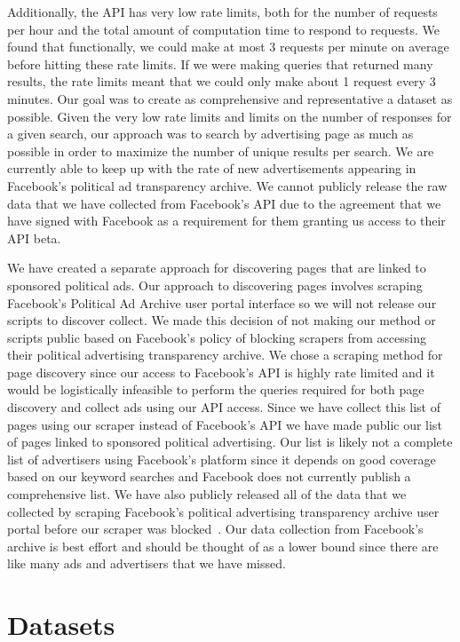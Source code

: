 \documentclass[fleqn,10pt]{wlscirep}
\begin{document}
Additionally, the API has very low rate limits, both for the number of requests per hour and the total amount of computation time to respond to requests. We found that functionally, we could make at most 3 requests per minute on average before hitting these rate limits. If we were making queries that returned many results, the rate limits meant that we could only make about 1 request every 3 minutes. Our goal was to create as comprehensive and representative a dataset as possible. Given the very low rate limits and limits on the number of responses for a given search, our approach was to search by advertising page as much as possible in order to maximize the number of unique results per search. We are currently able to keep up with the rate of new advertisements appearing in Facebook's political ad transparency archive. We cannot publicly release the raw data that we have collected from Facebook's API due to the agreement that we have signed with Facebook as a requirement for them granting us access to their API beta.

We have created a separate approach for discovering pages that are linked to sponsored political ads. Our approach to discovering pages involves scraping Facebook's Political Ad Archive user portal interface so we will not release our scripts to discover collect. We made this decision of not making our method or scripts public based on Facebook's policy of blocking scrapers from accessing their political advertising transparency archive. We chose a scraping method for page discovery since our access to Facebook's API is highly rate limited and it would be logistically infeasible to perform the queries required for both page discovery and collect ads using our API access. Since we have collect this list of pages using our scraper instead of Facebook's API we have made public our list of pages linked to sponsored political advertising. Our list is likely not a complete list of advertisers using Facebook's platform since it depends on good coverage based on our keyword searches and Facebook does not currently publish a comprehensive list. We have also publicly released all of the data that we collected by scraping Facebook's political advertising transparency archive user portal before our scraper was blocked~\cite{prior_facebook_ad_study}. Our data collection from Facebook's archive is best effort and should be thought of as a lower bound since there are like many ads and advertisers that we have missed.

\section*{Datasets}
\end{document}
